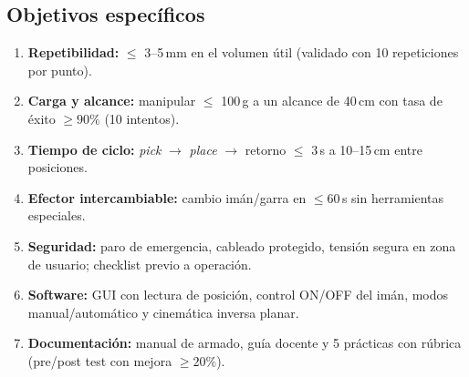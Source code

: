 \subsection{Objetivos específicos}
\begin{enumerate}
  \item \textbf{Repetibilidad:} $\leq$ 3--5\,mm en el volumen útil (validado con 10 repeticiones por punto).
  \item \textbf{Carga y alcance:} manipular $\leq$ 100\,g a un alcance de 40\,cm con tasa de éxito $\geq 90\%$ (10 intentos).
  \item \textbf{Tiempo de ciclo:} \emph{pick} $\rightarrow$ \emph{place} $\rightarrow$ retorno $\leq$ 3\,s a 10--15\,cm entre posiciones.
  \item \textbf{Efector intercambiable:} cambio imán/garra en $\leq 60$\,s sin herramientas especiales.
  \item \textbf{Seguridad:} paro de emergencia, cableado protegido, tensión segura en zona de usuario; checklist previo a operación.
  \item \textbf{Software:} GUI con lectura de posición, control ON/OFF del imán, modos manual/automático y cinemática inversa planar.
  \item \textbf{Documentación:} manual de armado, guía docente y 5 prácticas con rúbrica (pre/post test con mejora $\geq 20\%$).
\end{enumerate}
